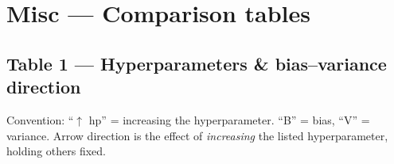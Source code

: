 
\section{Misc --- Comparison tables}


\subsection{Table 1 --- Hyperparameters \& bias--variance direction}

Convention: ``$\uparrow$ hp'' = increasing the hyperparameter.
``B'' = bias, ``V'' = variance. Arrow direction is the effect of \emph{increasing}
the listed hyperparameter, holding others fixed.

